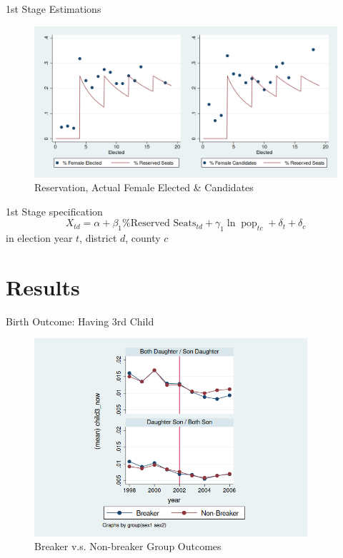 \documentclass[
  10pt,
  ignorenonframetext,
  aspectratio=43,
]{beamer}
\begin{document}
\begin{frame}{1st Stage Estimations}
\protect\hypertarget{st-stage-estimations}{}
\begin{figure}
\centering
\includegraphics{graphs/firstStage.png}
\caption{Reservation, Actual Female Elected \& Candidates}
\end{figure}
\end{frame}

\begin{frame}
\begin{block}{1st Stage specification}
\protect\hypertarget{st-stage-specification}{}
\[
X_{td} = \alpha + \beta_1 \text{\% Reserved Seats}_{td}  + \gamma_1 \ln \operatorname{pop}_{tc} + \delta_t + \delta_{c}
\] in election year \(t\), district \(d\), county \(c\)


\end{block}
\end{frame}

\hypertarget{results}{%
\section{Results}\label{results}}

\begin{frame}{Birth Outcome: Having 3rd Child}
\protect\hypertarget{birth-outcome-having-3rd-child}{}
\begin{figure}
\centering
\includegraphics[width=0.9\textwidth,height=\textheight]{graphs/child3_weighted_pretreat_2002_2.png}
\caption{Breaker v.s. Non-breaker Group Outcomes}
\end{figure}
\end{frame}
\end{document}
